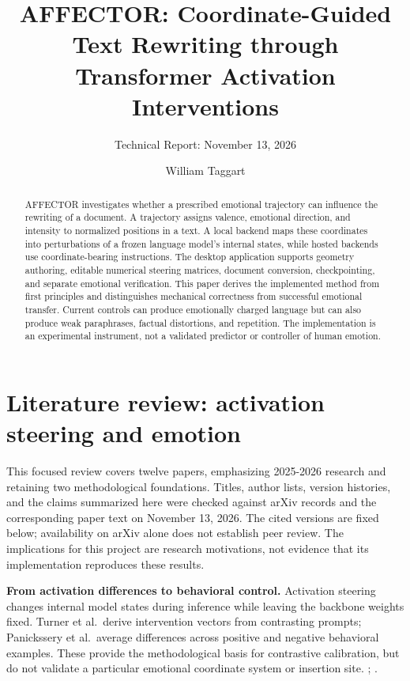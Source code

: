 \documentclass[manuscript,screen,nonacm]{acmart}
\begin{document}
\title{AFFECTOR: Coordinate-Guided Text Rewriting through Transformer
Activation Interventions}
\author{William Taggart}
\subtitle{Technical Report: November 13, 2026}
\begin{abstract}
AFFECTOR investigates whether a prescribed emotional trajectory can
influence the rewriting of a document. A trajectory assigns valence,
emotional direction, and intensity to normalized positions in a text. A
local backend maps these coordinates into perturbations of a frozen
language model's internal states, while hosted backends use
coordinate-bearing instructions. The desktop application supports
geometry authoring, editable numerical steering matrices, document
conversion, checkpointing, and separate emotional verification. This
paper derives the implemented method from first principles and
distinguishes mechanical correctness from successful emotional transfer.
Current controls can produce emotionally charged language but can also
produce weak paraphrases, factual distortions, and repetition. The
implementation is an experimental instrument, not a validated predictor
or controller of human emotion.
\end{abstract}
\maketitle
\section{Literature review: activation steering and
emotion}\label{literature-review-activation-steering-and-emotion}

This focused review covers twelve papers, emphasizing 2025-2026 research
and retaining two methodological foundations. Titles, author lists,
version histories, and the claims summarized here were checked against
arXiv records and the corresponding paper text on November 13, 2026. The
cited versions are fixed below; availability on arXiv alone does not
establish peer review. The implications for this project are research
motivations, not evidence that its implementation reproduces these
results.

\textbf{From activation differences to behavioral control.} Activation
steering changes internal model states during inference while leaving
the backbone weights fixed. Turner et al.~derive intervention vectors
from contrasting prompts; Panickssery et al.~average differences across
positive and negative behavioral examples. These provide the
methodological basis for contrastive calibration, but do not validate a
particular emotional coordinate system or insertion site.
\citep{turner2023actadd}; \citep{panickssery2024caa}.
\end{document}
